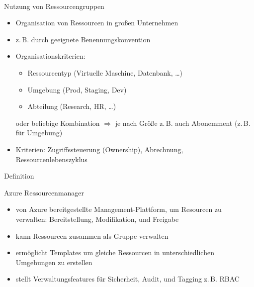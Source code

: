 \documentclass{scrartcl}
\newenvironment{flashcard}[2][]{%
    #1
    \vfill
    \centerline{\Large{#2}}
    \vfill
\newpage
}
{\newpage}
\begin{document}
    \begin{flashcard}[\ ]{Nutzung von Ressourcengruppen}
        \begin{itemize}
            \item Organisation von Ressourcen in großen Unternehmen
            \item z.\,B. durch geeignete Benennungskonvention
            \item Organisationskriterien:
                \begin{itemize}
                    \item Ressourcentyp (Virtuelle Maschine, Datenbank, \ldots)
                    \item Umgebung (Prod, Staging, Dev)
                    \item Abteilung (Research, HR, \ldots)
                \end{itemize}
                oder beliebige Kombination\newline
                $\Rightarrow$ je nach Größe z.\,B. auch Abonemment (z.\,B. für Umgebung)
            \item Kriterien: Zugriffssteuerung (Ownership), Abrechnung, Ressourcenlebenszyklus
        \end{itemize}

    \end{flashcard}

    \begin{flashcard}[Definition]{Azure Ressourcenmanager}
        \begin{itemize}
            \item von Azure bereitgestellte Management-Plattform, um Resourcen zu verwalten:\newline
            Bereitstellung, Modifikation, und Freigabe
            \item kann Ressourcen zusammen als Gruppe verwalten
            \item ermöglicht Templates um gleiche Ressourcen in unterschiedlichen Umgebungen zu erstellen
            \item stellt Verwaltungsfeatures für Sicherheit, Audit, und Tagging\newline
            z.\,B. RBAC
        \end{itemize}
        

    \end{flashcard}
\end{document}
